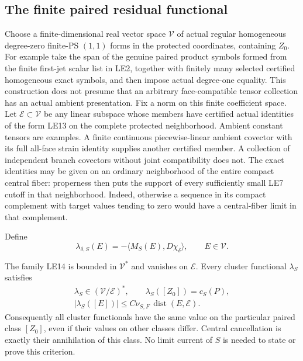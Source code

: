 \subsection{The finite paired residual functional}

Choose a finite-dimensional real vector space $\mathcal V$
of actual regular homogeneous degree-zero finite-PS $(1,1)$
forms in the protected coordinates, containing $Z_0$.  For
example take the span of the genuine paired product symbols
formed from the finite first-jet scalar list in LE2, together
with finitely many selected certified homogeneous exact symbols,
and then impose actual degree-one equality.  This construction
does not presume that an arbitrary face-compatible tensor
collection has an actual ambient presentation.  Fix a norm
on this finite coefficient space.  Let
$\mathcal E\subset\mathcal V$ be any linear subspace whose
members have certified actual identities of the form LE13 on
the complete protected neighborhood.  Ambient constant tensors
are examples.  A finite continuous piecewise-linear ambient
covector with its full all-face strain identity supplies another
certified member.  A collection of independent branch covectors
without joint compatibility does not.  The exact identities may
be given on an ordinary neighborhood of the entire compact
central fiber: properness then puts the support of every
sufficiently small LE7 cutoff in that neighborhood.  Indeed,
otherwise a sequence in its compact complement with target
values tending to zero would have a central-fiber limit in
that complement.

Define
\[
 \lambda_{\delta,S}(E)
       =-\langle M_S(E),D\chi_\delta\rangle,
                        \qquad E\in\mathcal V.
 \tag{LE14}
\]

\begin{proposition}
\label{prop:r13-paired-finite-residual}
The family LE14 is bounded in $\mathcal V^*$ and vanishes
on $\mathcal E$.  Every cluster functional $\lambda_S$ satisfies
\[
 \begin{gathered}
 \lambda_S\in(\mathcal V/\mathcal E)^*,\qquad
                  \lambda_S([Z_0])=c_S(P),\\
 |\lambda_S([E])|\le C\nu_{S,F}\,
                 \operatorname{dist}(E,\mathcal E).
 \end{gathered}
 \tag{LE15}
\]
Consequently all cluster functionals have the same value on
the particular paired class $[Z_0]$, even if their values on
other classes differ.  Central cancellation is exactly their
annihilation of this class.  No limit current of $S$ is needed
to state or prove this criterion.
\end{proposition}

